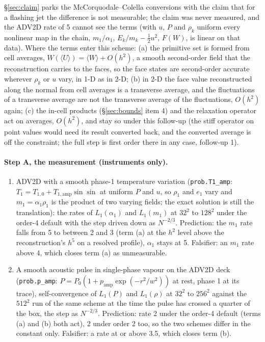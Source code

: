 \documentclass[11pt,a4paper]{article}
\newcommand{\code}[1]{\texttt{\small #1}}
\begin{document}
\S\ref{sec:claim} parks the McCorquodale--Colella conversions with the
claim that for a flashing jet the difference is not measurable; the
claim was never measured, and the ADV2D rate of 5 cannot see the terms
(with $u$, $P$ and $\rho_k$ uniform every nonlinear map in the chain,
$m_1/\alpha_1$, $E_k/m_k - \tfrac12 u^2$, $F(W)$, is linear on that
data).  Where the terms enter this scheme: (a) the primitive set is
formed from cell averages, $W(\langle U\rangle) = \langle W\rangle +
O(h^2)$, a smooth second-order field that the reconstruction carries
to the faces, so the face states are second-order accurate wherever
$\rho_k$ or $u$ vary, in 1-D as in 2-D; (b) in 2-D the face value
reconstructed along the normal from cell averages is a transverse
average, and the fluctuations of a transverse average are not the
transverse average of the fluctuations, $O(h^2)$ again; (c) the in-cell
products (\S\ref{sec:bounds} item 4) and the relaxation operator act on
averages, $O(h^2)$, and stay so under this follow-up (the stiff operator
on point values would need its result converted back, and the converted
average is off the constraint; the full step is first order there in
any case, follow-up 1).

\paragraph{Step A, the measurement (instruments only).}
\begin{enumerate}[nosep]
\item ADV2D with a smooth phase-1 temperature variation
      (\code{prob.T1\_amp}: $T_1 = T_{1,0} + T_{1,\mathrm{amp}}\sin\sin$
      at uniform $P$ and $u$, so $\rho_1$ and $e_1$ vary and
      $m_1 = \alpha_1\rho_1$ is the product of two varying fields; the
      exact solution is still the translation): the rates of
      $L_1(\alpha_1)$ and $L_1(m_1)$ at $32^2$ to $128^2$ under the
      order-4 default with the step driven down as $N^{-2/3}$.
      Prediction: the $m_1$ rate falls from 5 to between 2 and 3 (term
      (a) at the $h^2$ level above the reconstruction's $h^5$ on a
      resolved profile), $\alpha_1$ stays at 5.  Falsifier: an $m_1$
      rate above 4, which closes term (a) as unmeasurable.
\item A smooth acoustic pulse in single-phase vapour on the ADV2D deck
      (\code{prob.p\_amp}: $P = P_0(1 + p_{\mathrm{amp}}
      \exp(-r^2/w^2))$ at rest, phase 1 at its trace), self-convergence
      of $L_1(P)$ and $L_1(\rho)$ at $32^2$ to $256^2$ against the
      $512^2$ run of the same scheme at the time the pulse has crossed a
      quarter of the box, the step as $N^{-2/3}$.  Prediction: rate 2
      under the order-4 default (terms (a) and (b) both act), 2 under
      order 2 too, so the two schemes differ in the constant only.
      Falsifier: a rate at or above 3.5, which closes term (b).
\end{enumerate}
\end{document}
